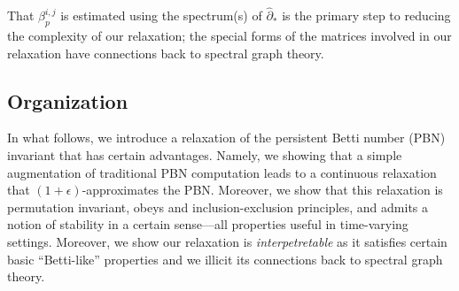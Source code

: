 \documentclass[10pt]{article}
\newcommand{\+}{%
	\raisebox{0.18ex}{\scaleobj{0.55}{+}}
}
\begin{document}
That $\beta_p^{i,j}$ is estimated using the spectrum(s) of $\hat{\partial}_\ast$ is the primary step to reducing the complexity of our relaxation; the special forms of the matrices involved in our relaxation have connections back to spectral graph theory. 


\subsection{Organization}

In what follows, we introduce a relaxation of the persistent Betti number (PBN) invariant that has certain advantages. Namely, we showing that a simple augmentation of traditional PBN computation leads to a continuous relaxation that $(1+\epsilon)$-approximates the PBN. Moreover, we show that this relaxation is permutation invariant, obeys and inclusion-exclusion principles, and admits a notion of stability in a certain sense---all properties useful in time-varying settings. 
Moreover, we show our relaxation is \emph{interpetretable} as it satisfies certain basic ``Betti-like'' properties and we illicit its connections back to spectral graph theory. 




\end{document}
